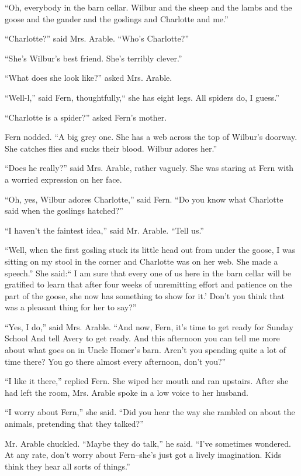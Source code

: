 \documentclass[a4paper, oneside]{book}
\begin{document}
 ``Oh, everybody in the barn cellar. Wilbur and the sheep and the
lambs and the goose and the gander and the goslings and Charlotte
and me.'' 

 ``Charlotte?'' said Mrs. Arable. ``Who's Charlotte?''

 ``She's Wilbur's best friend. She's terribly clever.''

 ``What does she look like?'' asked Mrs. Arable.

 ``Well-l,'' said Fern, thoughtfully,`` she has eight legs. All spiders
do, I guess.''

 ``Charlotte is a spider?'' asked Fern's mother.

 Fern nodded. ``A big grey one. She has a web across the top of
Wilbur's doorway. She catches flies and sucks their blood. Wilbur
adores her.''

 ``Does he really?'' said Mrs. Arable, rather vaguely. She was
staring at Fern with a worried expression on her face.

 ``Oh, yes, Wilbur adores Charlotte,'' said Fern. ``Do you know what
Charlotte said when the goslings hatched?''

 ``I haven't the faintest idea,'' said Mr. Arable. ``Tell us.''

 ``Well, when the first gosling stuck its little head out from under
the goose, I was sitting on my stool in the corner and Charlotte was
on her web. She made a speech.'' She said:`` I am sure that every one
of us here in the barn cellar will be gratified to learn that after four
weeks of unremitting effort and patience on the part of the goose,
she now has something to show for it.' Don't you think that was a
pleasant thing for her to say?''

 ``Yes, I do,'' said Mrs. Arable. ``And now, Fern, it's time to get 
 ready for Sunday School And tell Avery to get ready. And this
afternoon you can tell me more about what goes on in Uncle
Homer's barn. Aren't you spending quite a lot of time there? You
go there almost every afternoon, don't you?''

 ``I like it there,'' replied Fern. She wiped her mouth and ran
upstairs. After she had left the room, Mrs. Arable spoke in a low
voice to her husband.

 ``I worry about Fern,'' she said. ``Did you hear the way she rambled
on about the animals, pretending that they talked?''

 Mr. Arable chuckled. ``Maybe they do talk,'' he said. ``I've
sometimes wondered. At any rate, don't worry about Fern--she's
just got a lively imagination. Kids think they hear all sorts of
things.''
\end{document}
